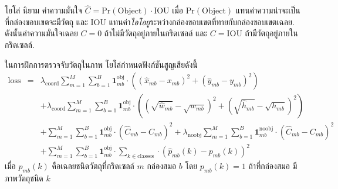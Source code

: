 โยโล่ นิยาม ค่าความมั่นใจ $\hat{C} = \mathrm{Pr}(\mbox{Object}) \cdot \mathrm{IOU}$
เมื่อ $\mathrm{Pr}(\mbox{Object})$ แทนค่าความน่าจะเป็นที่กล่องขอบเขตจะมีวัตถุ
และ $\mathrm{IOU}$ แทนค่า\textit{ไอโอยู}ระหว่างกล่องขอบเขตที่ทายกับกล่องขอบเขตเฉลย.
ดังนั้นค่าความมั่นใจเฉลย $C = 0$ ถ้าไม่มีวัตถุอยู่ภายในกริดเซลล์
และ $C = \mathrm{IOU}$ ถ้ามีวัตถุอยู่ภายในกริดเซลล์.

ในการฝึกการตรวจจับวัตถุในภาพ โยโล่กำหนดฟังก์ชันสูญเสียดังนี้
%
%
\begin{eqnarray}
\mathrm{loss} &=& \lambda_{\mathrm{coord}} \sum_{m=1}^M \sum_{b=1}^B \bm{1}_{mb}^{\mathrm{obj}} \cdot \left( (\hat{x}_{mb} - x_{mb})^2 + (\hat{y}_{mb} - y_{mb})^2 \right)
\nonumber \\
&\;&
+ \lambda_{\mathrm{coord}} \sum_{m=1}^M \sum_{b=1}^B \bm{1}_{mb}^{\mathrm{obj}} \cdot \left( (\sqrt{\hat{w}_{mb}} - \sqrt{w_{mb}})^2 + (\sqrt{\hat{h}_{mb}} - \sqrt{h_{mb}})^2 \right)
\nonumber \\
&\;&
+ \sum_{m=1}^M \sum_{b=1}^B \bm{1}_{mb}^{\mathrm{obj}} 
\cdot \left( \hat{C}_{mb} - C_{mb} \right)^2
+ \lambda_{\mathrm{noobj}} \sum_{m=1}^M \sum_{b=1}^B \bm{1}_{mb}^{\mathrm{noobj}} 
\cdot \left( \hat{C}_{mb} - C_{mb} \right)^2
\nonumber \\
&\;&
+ \sum_{m=1}^M \sum_{b=1}^B  \bm{1}_{mb}^{\mathrm{obj}} \cdot \sum_{k \in \mathrm{classes}} 
\cdot \left( \hat{p}_{mb}(k) - p_{mb}(k) \right)^2
\label{eq: YOLO loss function}
\end{eqnarray}
เมื่อ 
$p_{mb}(k)$ คือเฉลยชนิดวัตถุที่กริดเซลล์ $m$ กล่องสมอ $b$
โดย $p_{mb}(k) = 1$ ถ้าที่กล่องสมอ มีภาพวัตถุชนิด $k$
